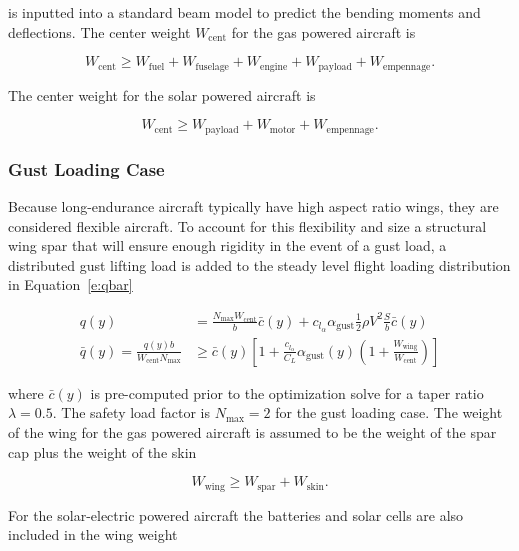 is inputted into a standard beam model to predict the bending moments and deflections. The center weight $W_{\text{cent}}$ for the gas powered aircraft is

\begin{equation}
    W_{\text{cent}} \geq W_{\text{fuel}} + W_{\text{fuselage}} + W_{\text{engine}} + W_{\text{payload}} + W_{\text{empennage}}.
\end{equation}

The center weight for the solar powered aircraft is

\begin{equation}
    W_{\text{cent}} \geq W_{\text{payload}} + W_{\text{motor}} + W_{\text{empennage}}.
\end{equation}


\subsubsection{Gust Loading Case}

Because long-endurance aircraft typically have high aspect ratio wings, they are considered flexible aircraft. 
To account for this flexibility and size a structural wing spar that will ensure enough rigidity in the event of a gust load, a distributed gust lifting load is added to the steady level flight loading distribution in Equation~\eqref{e:qbar}

\begin{align}
    q(y) &= \frac{N_{\text{max}}W_{\text{cent}}}{b}\bar{c}(y) + c_{l_{\alpha}} \alpha_{\text{gust}} \frac{1}{2} \rho V^2 \frac{S}{b}\bar{c}(y) \\
    \bar{q}(y) = \frac{q(y)b}{W_{\text{cent}}N_{\text{max}}} &\geq \bar{c}(y) \left[1 + \frac{c_{l_{\alpha}}}{C_L} \alpha_{\text{gust}} (y) \left(1 + \frac{W_{\text{wing}}}{W_{\text{cent}}} \right) \right]
\end{align}

where $\bar{c}(y)$ is pre-computed prior to the optimization solve for a taper ratio $\lambda = 0.5$. The safety load factor is $N_{\text{max}}=2$ for the gust loading case. The weight of the wing for the gas powered aircraft is assumed to be the weight of the spar cap plus the weight of the skin 

\begin{equation}
    W_{\text{wing}} \geq W_{\text{spar}} + W_{\text{skin}}.
\end{equation}

For the solar-electric powered aircraft the batteries and solar cells are also included in the wing weight

